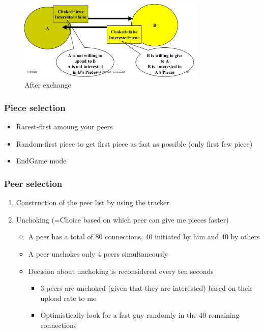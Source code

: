 \begin{figure}[!ht]
\centering
\includegraphics[width=9cm]{img/after.png}
\caption{After exchange}
\end{figure}
\FloatBarrier{}


\subsubsection{Piece selection}
\begin{itemize}
\item Rarest-first amoung your peers
\item Random-first piece to get first piece as fast as possible (only first few piece)
\item EndGame mode
\end{itemize}

\subsubsection{Peer selection}
\begin{enumerate}
\item Construction of the peer list by using the tracker
\item Unchoking (=Choice based on which peer can give me pieces faster)

\begin{itemize}
    \item A peer has a total of 80 connections, 40 initiated by
    him and 40 by others
    \item A peer unchokes only 4 peers simultaneously
    \item Decision about unchoking is reconsidered every ten
    seconds
    \begin{itemize}
        \item 3 peers are unchoked (given that they are interested)
        based on their upload rate to me
        \item Optimistically look for a fast guy randomly in the 40
        remaining connections
    \end{itemize}
\end{itemize}
\end{enumerate}
